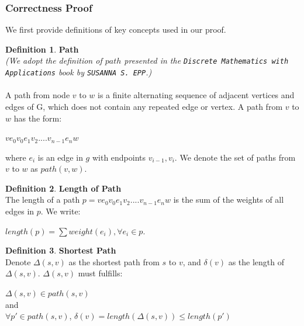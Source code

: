 \documentclass[11pt, a4paper]{article} %
\theoremstyle{definition}
\newtheorem{definition}{Definition}[section]
\begin{document}
\subsubsection{Correctness Proof}
We first provide definitions of key concepts used in our proof.
\theoremstyle{definition}
\begin{definition}\textbf{Path}\\
\textit{(We adopt the definition of $path$ presented in the \texttt{Discrete Mathematics with Applications} book by \texttt{SUSANNA S. EPP}.)}
\\\\
A path from node $v$ to $w$ is a finite alternating sequence of adjacent vertices and edges of G, which does not contain any repeated edge or vertex. A path from $v$ to $w$ has the form: 
\begin{center}
 $ve_0v_0e_1v_2....v_{n-1}e_nw$ 
\end{center}
where $e_i$ is an edge in $g$ with endpoints $v_{i-1}, v_i$. We denote the set of paths from $v$ to $w$ as $path(v, w)$.
\end{definition}
\begin{definition}\textbf{Length of Path} \\
The length of a path $p = ve_0v_0e_1v_2....v_{n-1}e_nw$ is the sum of the weights of all edges in $p$. We write: 
\begin{center}
  $length(p) = \sum weight(e_i), \forall e_i \in p$. 
\end{center} 
\end{definition}
\begin{definition}\textbf{Shortest Path}\\
Denote $\Delta(s, v)$ as the shortest path from $s$ to $v$, and $\delta(v)$ as the length of $\Delta(s, v)$. $\Delta(s, v)$ must fulfills: 
\begin{center}
$\Delta(s, v) \in path(s, v)$ 
\\
and 
\\
$\forall p' \in path(s, v)$, $\delta(v) = length(\Delta(s, v)) \leq length(p')$
\end{center}
\end{definition}
\end{document}
